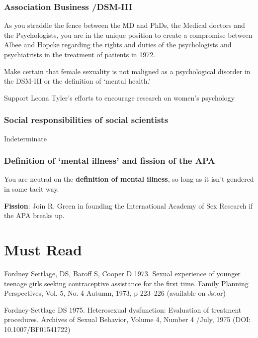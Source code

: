 \begin{refsection}
\subsubsection{Association Business \slash  DSM-III}
\label{associationbusinessdsm-iii}

As you straddle the fence between the MD and PhDs, the Medical doctors and the Psychologists, you are in the unique position to create a compromise between Albee and Hopcke regarding the rights and duties of the psychologists and psychiatrists in the treatment of patients in 1972.

Make certain that female sexuality is not maligned as a psychological disorder in the DSM-III or the definition of `mental health.' 

Support Leona Tyler’s efforts to encourage research on women’s psychology

\subsubsection{Social responsibilities of social scientists}
\label{socialresponsibilitiesofsocialscientists}

Indeterminate

\subsubsection{Definition of ‘mental illness’ and fission of the APA}
\label{definitionof‘mentalillness’andfissionoftheapa}

You are neutral on the \textbf{definition of mental illness}, so long as it isn’t gendered in some tacit way.

\textbf{Fission}: Join R. Green in founding the International Academy of Sex Research if the APA breaks up.

\section{Must Read}
\label{mustread}

Fordney Settlage, DS, Baroff S, Cooper D 1973. Sexual experience of younger teenage girls seeking contraceptive assistance for the first time. Family Planning Perspectives, Vol. 5, No. 4 Autumn, 1973, p 223--226 (available on Jstor)

Fordney-Settlage DS 1975. Heterosexual dysfunction: Evaluation of treatment procedures. Archives of Sexual Behavior, Volume 4, Number 4 \slash  July, 1975 (DOI: 10.1007\slash BF01541722)


\end{refsection}
